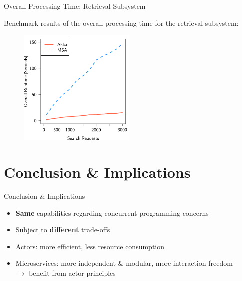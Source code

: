 \documentclass{beamer}
\begin{document}

\begin{frame}{Overall Processing Time: Retrieval Subsystem}

Benchmark results of the overall processing time for the retrieval subsystem:

\begin{center}
  \begin{figure} 
    \includegraphics[width=0.5\textwidth]{graphics/eval-search-rtt-overall.pdf} 
  \end{figure}
\end{center}

\end{frame}


\section{Conclusion \& Implications}


\begin{frame}{Conclusion \& Implications}

\begin{itemize}
  \item \textbf{Same} capabilities regarding concurrent programming concerns
  \item Subject to \textbf{different} trade-offs
  \item Actors: more efficient, less resource consumption
  \item Microservices: more independent \& modular, more interaction freedom \\%
        $\rightarrow$ benefit from actor principles 
\end{itemize}

\end{frame}
\end{document}
